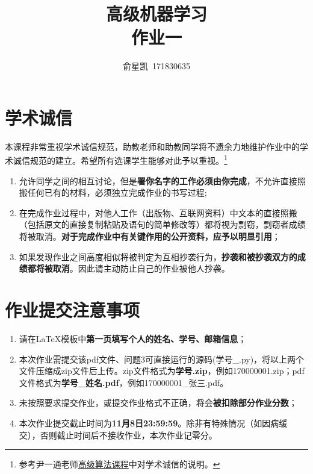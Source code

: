 \documentclass[a4paper,UTF8]{article}
\numberwithin{equation}{section}
\begin{document}
\title{高级机器学习\\
作业一}
\author{俞星凯\, 171830635} 
\maketitle

\section*{学术诚信}

本课程非常重视学术诚信规范，助教老师和助教同学将不遗余力地维护作业中的学术诚信规范的建立。希望所有选课学生能够对此予以重视。\footnote{参考尹一通老师\href{http://tcs.nju.edu.cn/wiki/}{高级算法课程}中对学术诚信的说明。}

\begin{tcolorbox}
	\begin{enumerate}
		\item[(1)] 允许同学之间的相互讨论，但是{\color{red}\textbf{署你名字的工作必须由你完成}}，不允许直接照搬任何已有的材料，必须独立完成作业的书写过程;
		\item[(2)] 在完成作业过程中，对他人工作（出版物、互联网资料）中文本的直接照搬（包括原文的直接复制粘贴及语句的简单修改等）都将视为剽窃，剽窃者成绩将被取消。{\color{red}\textbf{对于完成作业中有关键作用的公开资料，应予以明显引用}}；
		\item[(3)] 如果发现作业之间高度相似将被判定为互相抄袭行为，{\color{red}\textbf{抄袭和被抄袭双方的成绩都将被取消}}。因此请主动防止自己的作业被他人抄袭。
	\end{enumerate}
\end{tcolorbox}

\section*{作业提交注意事项}
\begin{tcolorbox}
	\begin{enumerate}
		\item[(1)] 请在LaTeX模板中{\color{red}\textbf{第一页填写个人的姓名、学号、邮箱信息}}；
		\item[(2)] 本次作业需提交该pdf文件、问题3可直接运行的源码(学号\_.py)，将以上两个文件压缩成zip文件后上传。zip文件格式为{\color{red}\textbf{学号.zip}}，例如170000001.zip；pdf文件格式为{\color{red}\textbf{学号\_姓名.pdf}}，例如170000001\_张三.pdf。
		\item[(3)] 未按照要求提交作业，或提交作业格式不正确，将会{\color{red}\textbf{被扣除部分作业分数}}；
		\item[(4)] 本次作业提交截止时间为{\color{red}\textbf{11月8日23:59:59}}。除非有特殊情况（如因病缓交），否则截止时间后不接收作业，本次作业记零分。
	\end{enumerate}
\end{tcolorbox}
\end{document}
